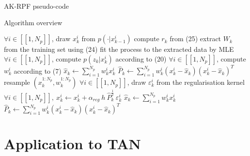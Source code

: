 \documentclass[9pt]{beamer}
\begin{document}
\begin{frame}{AK-RPF pseudo-code}
\begin{block}{Algorithm overview}

\begin{algorithmic}
\algrenewcommand{}
\algrenewcommand{}
\algrenewcommand{}

\State $\forall i \in [\![1, N_p]\!]$, draw $x_k^i$ from $p(\cdot|x_{k-1}^i)$ 
\State \textcolor{BrickRed}{compute $r_k$ from (25) }
\State \textcolor{BrickRed}{extract $W_k$ from the training set using (24)}
\State \textcolor{BrickRed}{fit the process to the extracted data by MLE }
\State \textcolor{BrickRed}{$\forall i \in [\![1, N_p]\!]$, compute $p(z_k|x_k^i)$ according to (20) }
\State $\forall i \in [\![1, N_p]\!]$, compute $w_k^i$ according to (7) 
\State $\hat x_k \gets \sum_{i=1}^{N_p} w_k^i x_k^i$ 
\State $\hat P_k \gets \sum_{i=1}^{N_p} w_k^i (x_k^i - \hat x_k) (x_k^i - \hat x_k)^T$
\State resample $\left(x_k^{1:N_p},w_k^{1:N_p}\right)$ 
\State $\forall i \in [\![1, N_p]\!]$, draw $\varepsilon_k^i$ from the regularisation kernel 
\State $\forall i \in [\![1, N_p]\!], \: x_k^i \gets x_k^i + \alpha_{reg}\:h\:\hat P_k^{\frac{1}{2}}\:\varepsilon_k^i$
\State $\hat x_k \gets \sum_{i=1}^{N_p} w_k^i x_k^i$ 
\State $\hat P_k \gets \sum_{i=1}^{N_p} w_k^i (x_k^i - \hat x_k) (x_k^i - \hat x_k)^T$
\EndIf
\end{algorithmic}

\end{block}
\end{frame}

\section{Application to TAN}
\end{document}
